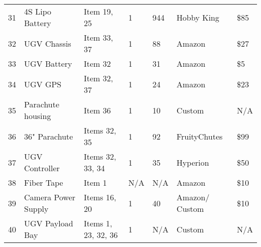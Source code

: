\documentclass[]{auvsi_doc}
\begin{document}
\begin{table}[h!]
\begin{center}
\begin{tabular}{p{1cm}p{4cm}p{3cm}p{1.5cm}p{1cm}p{2.5cm}p{1cm}}
				31 & 4S Lipo Battery & Item 19, 25 & 1 & 944 & Hobby King & \$85 \\
				32 & UGV Chassis & Item 33, 37 & 1 & 88 & Amazon & \$27 \\
				33 & UGV Battery & Item 32 & 1 & 31 & Amazon & \$5  \\
				34 & UGV GPS & Item 32, 37 & 1 & 24 & Amazon & \$23 \\
				35 & Parachute housing & Item 36 & 1 & 10 & Custom & N/A \\
				36 & 36" Parachute & Items 32, 35 & 1 & 92 & FruityChutes & \$99 \\
				37 & UGV Controller & Items 32, 33, 34 & 1 & 35 & Hyperion & \$50 \\
				38 & Fiber Tape & Item 1 & N/A & N/A & Amazon & \$10 \\
				39 & Camera Power Supply & Items 16, 20 & 1 & 40 & Amazon/ \newline Custom & \$10 \\
				40 & UGV Payload Bay & Items 1, 23, 32, 36 & 1 & N/A & Custom & N/A \\

				\bottomrule
			\end{tabular}
		\end{center}
	\end{table}
\end{document}
